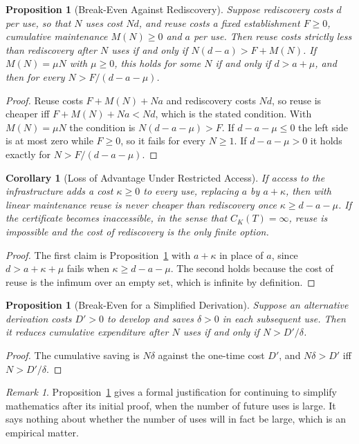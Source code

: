 \documentclass[11pt,letterpaper]{report}
\theoremstyle{plain}
\newtheorem{proposition}[theorem]{Proposition}
\newtheorem{corollary}[theorem]{Corollary}
\theoremstyle{definition}
\theoremstyle{remark}
\newtheorem{remark}[theorem]{Remark}
\begin{document}
\begin{proposition}[Break-Even Against Rediscovery]\label{pr:breakeven}
Suppose rediscovery costs $d$ per use, so that $N$ uses cost $Nd$, and reuse costs a fixed establishment $F\ge0$, cumulative maintenance $M(N)\ge0$ and $a$ per use. Then reuse costs strictly less than rediscovery after $N$ uses if and only if $N(d-a)>F+M(N)$. If $M(N)=\mu N$ with $\mu\ge0$, this holds for some $N$ if and only if $d>a+\mu$, and then for every $N>F/(d-a-\mu)$.
\end{proposition}
\begin{proof}
Reuse costs $F+M(N)+Na$ and rediscovery costs $Nd$, so reuse is cheaper iff $F+M(N)+Na<Nd$, which is the stated condition. With $M(N)=\mu N$ the condition is $N(d-a-\mu)>F$. If $d-a-\mu\le0$ the left side is at most zero while $F\ge0$, so it fails for every $N\ge1$. If $d-a-\mu>0$ it holds exactly for $N>F/(d-a-\mu)$.
\end{proof}

\begin{corollary}[Loss of Advantage Under Restricted Access]\label{co:access}
If access to the infrastructure adds a cost $\kappa\ge0$ to every use, replacing $a$ by $a+\kappa$, then with linear maintenance reuse is never cheaper than rediscovery once $\kappa\ge d-a-\mu$. If the certificate becomes inaccessible, in the sense that $C_K(T)=\infty$, reuse is impossible and the cost of rediscovery is the only finite option.
\end{corollary}
\begin{proof}
The first claim is Proposition~\ref{pr:breakeven} with $a+\kappa$ in place of $a$, since $d>a+\kappa+\mu$ fails when $\kappa\ge d-a-\mu$. The second holds because the cost of reuse is the infimum over an empty set, which is infinite by definition.
\end{proof}

\begin{proposition}[Break-Even for a Simplified Derivation]\label{pr:simplify}
Suppose an alternative derivation costs $D'>0$ to develop and saves $\delta>0$ in each subsequent use. Then it reduces cumulative expenditure after $N$ uses if and only if $N>D'/\delta$.
\end{proposition}
\begin{proof}
The cumulative saving is $N\delta$ against the one-time cost $D'$, and $N\delta>D'$ iff $N>D'/\delta$.
\end{proof}

\begin{remark}
Proposition~\ref{pr:simplify} gives a formal justification for continuing to simplify mathematics after its initial proof, when the number of future uses is large. It says nothing about whether the number of uses will in fact be large, which is an empirical matter.
\end{remark}
\end{document}
